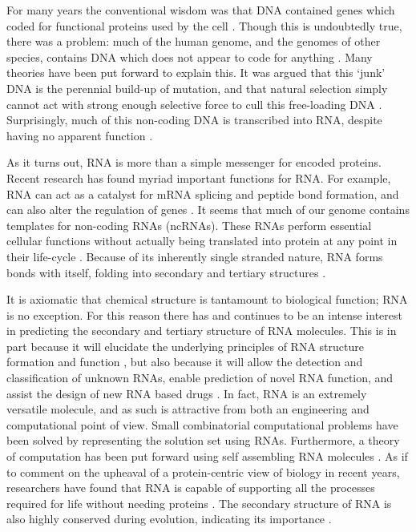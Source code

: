 \documentclass{cshonours}
\begin{document}
For many years the conventional wisdom was that DNA contained genes which coded for functional proteins used by the cell \cite{albertsessential}. Though this is undoubtedly true, there was a problem: much of the human genome, and the genomes of other species, contains DNA which does not appear to code for anything \cite{beaton1999eukaryotic}. Many theories have been put forward to explain this. It was argued that this `junk' DNA is the perennial build-up of mutation, and that natural selection simply cannot act with strong enough selective force to cull this free-loading DNA \cite{beaton1999eukaryotic}. Surprisingly, much of this non-coding DNA is transcribed into RNA, despite having no apparent function \cite{leung2013coral}. 

As it turns out, RNA is more than a simple messenger for encoded proteins. Recent research has found myriad important functions for RNA. For example, RNA can act as a catalyst for mRNA splicing and peptide bond formation, and can also alter the regulation of genes \cite{xu2012statistical}. It seems that much of our genome contains templates for non-coding RNAs (ncRNAs). These RNAs perform essential cellular functions without actually being translated into protein at any point in their life-cycle \cite{leung2013coral}. Because of its inherently single stranded nature, RNA forms bonds with itself, folding into secondary and tertiary structures \cite{conn1998rna}.


It is axiomatic that chemical structure is tantamount to biological function; RNA is no exception. For this reason there has and continues to be an intense interest in predicting the secondary and tertiary structure of RNA molecules. This is in part because it will elucidate the underlying principles of RNA structure formation and function \cite{conn1998rna}, but also because it will allow the detection and classification of unknown RNAs, enable prediction of novel RNA function, and assist the design of new RNA based drugs \cite{condon2003problems}. In fact, RNA is an extremely versatile molecule, and as such is attractive from both an engineering and computational point of view. Small combinatorial computational problems have been solved by representing the solution set using RNAs. Furthermore, a theory of computation has been put forward using self assembling RNA molecules \cite{condon2003problems}. As if to comment on the upheaval of a protein-centric view of biology in recent years, researchers have found that RNA is capable of supporting all the processes required for life without needing proteins \cite{condon2003problems}. The secondary structure of RNA is also highly conserved during evolution, indicating its importance \cite{hofacker2008rna}. 
\end{document}
